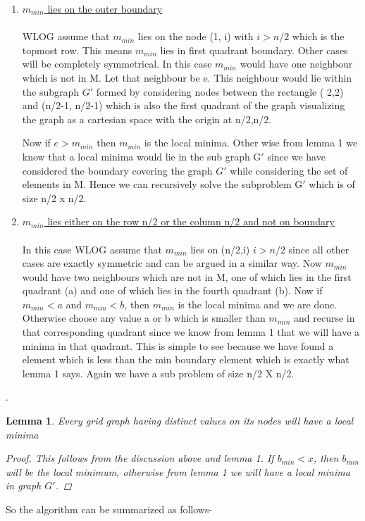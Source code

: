 \documentclass[12pt]{article}
\newtheorem{lemma}[theorem]{Lemma}
\begin{document}
\begin{enumerate}
\item  \underline{$m_{min}$ lies on the outer boundary}\\\\
WLOG assume that $m_{min}$ lies on the node (1, i) with $i > n/2$  which is the topmost row. This means $m_{min}$ lies in first quadrant boundary. Other cases will be completely symmetrical. In this case $m_{min}$ would have one neighbour which is not in M. Let that neighbour be e. This neighbour would lie within the subgraph $G'$ formed by considering nodes between the rectangle ( 2,2) and (n/2-1, n/2-1) which is also the first quadrant of the graph visualizing the graph as a cartesian space with the origin at n/2,n/2.

Now if $e > m_{min}$ then $m_{min}$ is the local minima. Other wise from lemma 1 we know that a local minima would lie in the sub graph G$'$ since we have considered the boundary covering the graph $G'$ while considering the set of elements in M. Hence we can recursively solve the subproblem G$'$ which is of size n/2 x n/2.

\item \underline{$m_{min}$ lies either on the row n/2 or the column n/2 and not on boundary}\\\\
In this case WLOG assume that $m_{min}$ lies on (n/2,i) $i > n/2$ since all other cases are exactly symmetric and can be argued in a similar way. Now $m_{min}$ would have two neighbours which are not in M, one of which lies in the first quadrant (a) and one of which lies in the fourth quadrant (b). Now if $m_{min} < a$ and $m_{min} < b$, then $m_{min}$ is the local minima and we are done. Otherwise choose any value a or b which is smaller than $m_{min}$ and recurse in that corresponding quadrant since we know from lemma 1 that we will have a minima in that quadrant. This is simple to see because we have found a element which is less than the min boundary element which is exactly what lemma 1 says. Again we have a sub problem of size n/2 X n/2.
\end{enumerate}. 

\begin{lemma} Every grid graph having distinct values on its nodes will have a local minima
\begin{proof}
This follows from the discussion above and lemma 1. If $b_{min} < x$, then $b_{min}$ will be the local minimum, otherwise from lemma 1  we will have a local minima in graph $G'$.
\end{proof}
\end{lemma}
\newpage
So the algorithm can be summarized as follows- 
\end{document}
